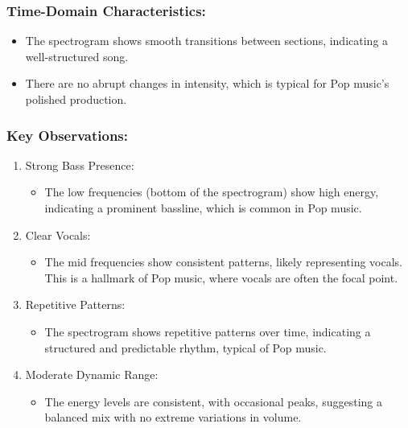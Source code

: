 \documentclass[a4paper,12pt]{article}
\begin{document}
\subsubsection{Time-Domain Characteristics:}
\begin{itemize}
    \item The spectrogram shows smooth transitions between sections, indicating a well-structured song.
    \item There are no abrupt changes in intensity, which is typical for Pop music's polished production.
\end{itemize}
\subsubsection{Key Observations:}

\begin{enumerate}
    \item Strong Bass Presence:
        \begin{itemize}
            \item The low frequencies (bottom of the spectrogram) show high energy, indicating a prominent bassline, which is common in Pop music.    
        \end{itemize}
    \item Clear Vocals:
        \begin{itemize}
            \item The mid frequencies show consistent patterns, likely representing vocals. This is a hallmark of Pop music, where vocals are often the focal point.   
        \end{itemize}
    \item Repetitive Patterns:
        \begin{itemize}
            \item The spectrogram shows repetitive patterns over time, indicating a structured and predictable rhythm, typical of Pop music.   
        \end{itemize}
    \item Moderate Dynamic Range:
        \begin{itemize}
            \item The energy levels are consistent, with occasional peaks, suggesting a balanced mix with no extreme variations in volume.  
        \end{itemize}
\end{enumerate}
\newpage
\end{document}
